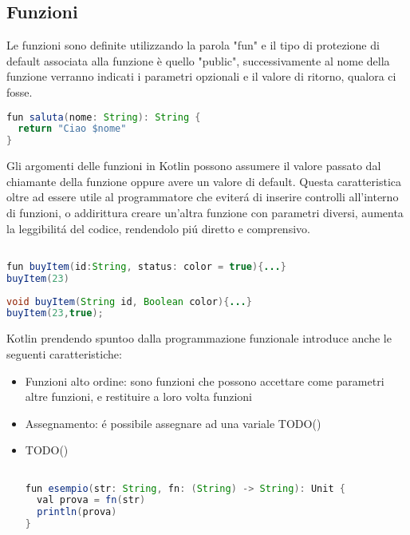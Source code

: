 \subsection{Funzioni}
Le funzioni sono definite utilizzando la parola "fun" e il tipo di protezione di default associata alla funzione è quello "public", successivamente al nome della funzione verranno indicati i parametri opzionali e il valore di ritorno, qualora ci fosse.


\begin{lstlisting}[language=java,caption={Esempio Kotlin}]
fun saluta(nome: String): String {
  return "Ciao $nome"
}
\end{lstlisting}


Gli argomenti delle funzioni in Kotlin possono assumere il valore passato dal chiamante della funzione oppure avere un valore di default. Questa caratteristica oltre ad essere utile al programmatore che eviter\'a di inserire controlli all'interno di funzioni, o addirittura creare un'altra funzione con parametri diversi, aumenta la leggibilit\'a del codice, rendendolo pi\'u diretto e comprensivo.

\begin{lstlisting}[language=java,caption={Esempio Kotlin}]

fun buyItem(id:String, status: color = true){...}
buyItem(23)
\end{lstlisting}

\begin{lstlisting}[language=java,caption={Esempio Java}]
void buyItem(String id, Boolean color){...}
buyItem(23,true);

\end{lstlisting}

Kotlin prendendo spuntoo dalla programmazione funzionale introduce anche le seguenti caratteristiche:

\begin{itemize}                         %

\item Funzioni alto ordine: sono funzioni che possono accettare come parametri altre funzioni, e restituire a loro volta funzioni

\item Assegnamento: \'e possibile assegnare ad una variale TODO()

\item TODO()
\begin{lstlisting}[language=java,caption={Esempio Kotlin}]

fun esempio(str: String, fn: (String) -> String): Unit {
  val prova = fn(str)
  println(prova)
}
\end{lstlisting}

\end{itemize}




